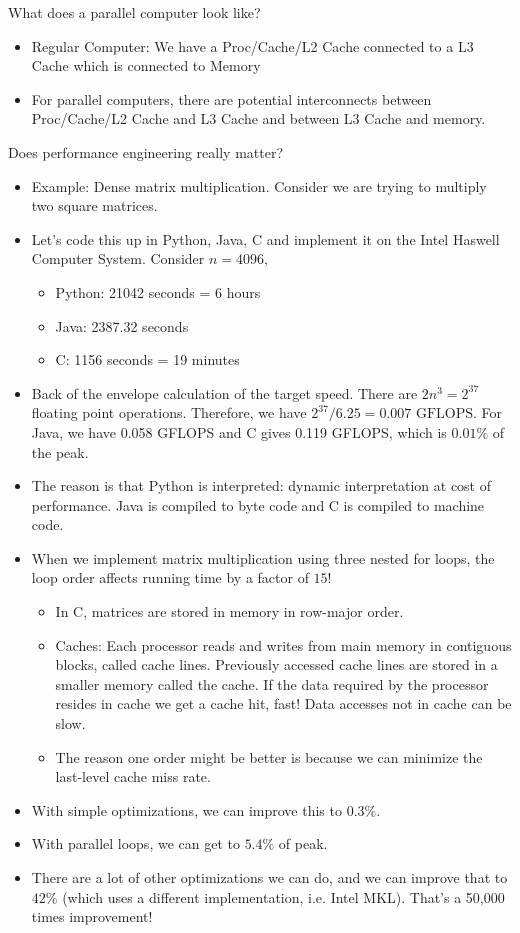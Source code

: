 \documentclass{article}
\numberwithin{equation}{section}
\begin{document}
What does a parallel computer look like?
\begin{itemize}
    \item Regular Computer: We have a Proc/Cache/L2 Cache connected to a L3 Cache which is connected to Memory
    \item For parallel computers, there are potential interconnects between Proc/Cache/L2 Cache and L3 Cache and between L3 Cache and memory.
\end{itemize}
Does performance engineering really matter?
\begin{itemize}
    \item Example: Dense matrix multiplication. Consider we are trying to multiply two square matrices.
    \item Let's code this up in Python, Java, C and implement it on the Intel Haswell Computer System. Consider $n=4096,$
    \begin{itemize}
        \item Python: 21042 seconds = 6 hours
        \item Java: 2387.32 seconds
        \item C: 1156 seconds = 19 minutes
    \end{itemize} 
    \item Back of the envelope calculation of the target speed. There are $2n^3=2^{37}$ floating point operations. Therefore, we have $2^{37}/6.25 = 0.007 \text{ GFLOPS}.$ For Java, we have 0.058 GFLOPS and C gives 0.119 GFLOPS, which is $0.01\%$ of the peak.
    \item The reason is that Python is interpreted: dynamic interpretation at cost of performance. Java is compiled to byte code and C is compiled to machine code.
    \item When we implement matrix multiplication using three nested for loops, the loop order affects running time by a factor of $15$!
    \begin{itemize}
        \item In C, matrices are stored in memory in row-major order.
        \item Caches: Each processor reads and writes from main memory in contiguous blocks, called cache lines. Previously accessed cache lines are stored in a smaller memory called the cache. If the data required by the processor resides in cache we get a cache hit, fast! Data accesses not in cache can be slow.
        \item The reason one order might be better is because we can minimize the last-level cache miss rate.
    \end{itemize}
    \item With simple optimizations, we can improve this to $0.3\%.$
    \item With parallel loops, we can get to $5.4\%$ of peak.
    \item There are a lot of other optimizations we can do, and we can improve that to $42\%$ (which uses a different implementation, i.e. Intel MKL). That's a 50,000 times improvement!
\end{itemize}
\end{document}
